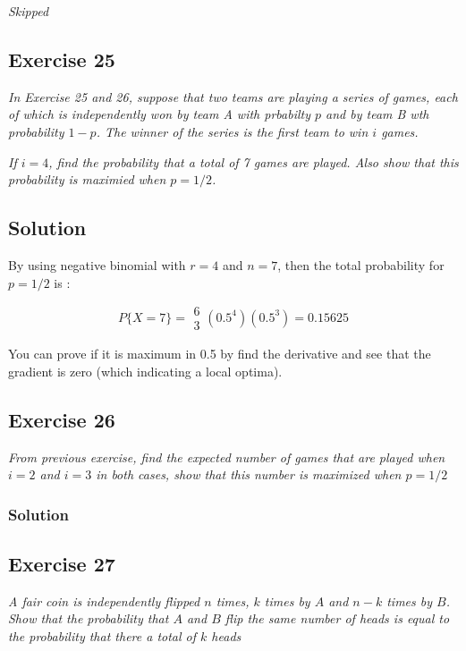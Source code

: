 \documentclass[12pt,a4paper]{article}
\begin{document}
\textit{Skipped}


\subsection{Exercise 25}

\textit{In Exercise 25 and 26, suppose that two teams are playing a series of games, each of which is independently won by team A with prbabilty $p$ and by team B wth probability $1-p$. The winner of the series is the first team to win $i$ games.}

\textit{If $i=4$, find the probability that a total of 7 games are played. Also show that this probability is maximied when $p=1/2$.}

\subsection{Solution}

By using negative binomial with $r=4$ and $n=7$, then the total probability for $p=1/2$ is :

\[
P\{X=7\} = \begin{array}{c}6\\3\end{array}(0.5^4) (0.5^{3}) = 0.15625
\]

You can prove if it is maximum in 0.5 by find the derivative and see that the gradient is zero (which indicating a local optima).

\subsection{Exercise 26}

\textit{From previous exercise, find the expected number of games that are played when $i=2$ and $i=3$ in both cases, show that this number is maximized when $p=1/2$}

\subsubsection{Solution}


\subsection{Exercise 27}

\textit{A fair coin is independently flipped $n$ times, $k$ times by $A$ and $n-k$ times by $B$. Show that the probability that $A$ and $B$ flip the same number of heads is equal to the probability that there a total of $k$ heads}
\end{document}
